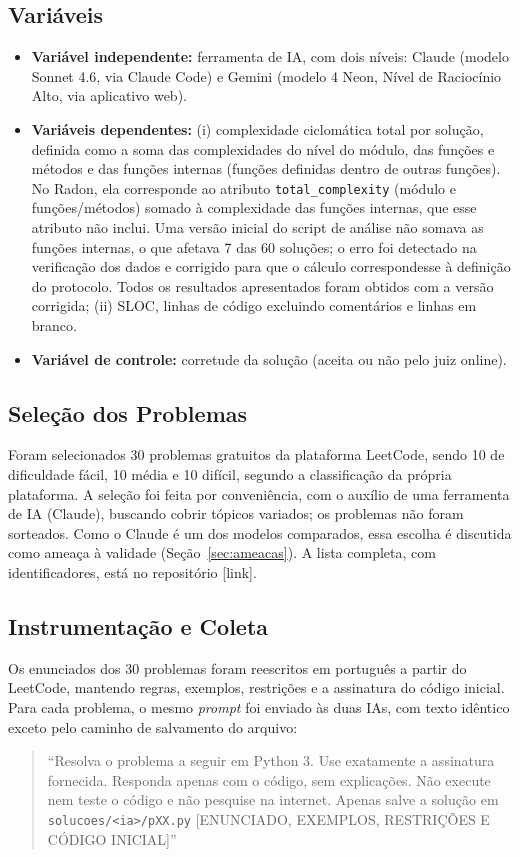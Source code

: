 \documentclass[12pt]{article}
\begin{document}
\subsection{Variáveis}
\begin{itemize}
  \item \textbf{Variável independente:} ferramenta de IA, com dois níveis: Claude (modelo
  Sonnet 4.6, via Claude Code) e Gemini (modelo 4 Neon, Nível de Raciocínio Alto, via
  aplicativo web).
  \item \textbf{Variáveis dependentes:} (i) complexidade ciclomática total por solução,
  definida como a soma das complexidades do nível do módulo, das funções e métodos e das funções
  internas (funções definidas dentro de outras funções). No Radon, ela corresponde ao atributo
  \texttt{total\_complexity} (módulo e funções/métodos) somado à complexidade das funções
  internas, que esse atributo não inclui. Uma versão inicial do script de análise não somava as
  funções internas, o que afetava 7 das 60 soluções; o erro foi detectado na verificação dos
  dados e corrigido para que o cálculo correspondesse à definição do protocolo. Todos os
  resultados apresentados foram obtidos com a versão corrigida;
  (ii) SLOC, linhas de código excluindo comentários e linhas em branco.
  \item \textbf{Variável de controle:} corretude da solução (aceita ou não pelo juiz online).
\end{itemize}

\subsection{Seleção dos Problemas}
Foram selecionados 30 problemas gratuitos da plataforma LeetCode, sendo 10 de dificuldade
fácil, 10 média e 10 difícil, segundo a classificação da própria plataforma. A seleção foi feita
por conveniência, com o auxílio de uma ferramenta de IA (Claude), buscando cobrir tópicos
variados; os problemas não foram sorteados. Como o Claude é um dos modelos comparados, essa
escolha é discutida como ameaça à validade (Seção~\ref{sec:ameacas}). A lista completa, com
identificadores, está no repositório [link].

\subsection{Instrumentação e Coleta}
Os enunciados dos 30 problemas foram reescritos em português a partir do LeetCode, mantendo
regras, exemplos, restrições e a assinatura do código inicial. Para cada problema, o mesmo
\emph{prompt} foi enviado às duas IAs, com texto idêntico exceto pelo caminho de salvamento
do arquivo:
\begin{quote}\small
``Resolva o problema a seguir em Python 3. Use exatamente a assinatura fornecida.
Responda apenas com o código, sem explicações. Não execute nem teste o código e não pesquise
na internet. Apenas salve a solução em \texttt{solucoes/<ia>/pXX.py}
[ENUNCIADO, EXEMPLOS, RESTRIÇÕES E CÓDIGO INICIAL]''
\end{quote}
\end{document}
